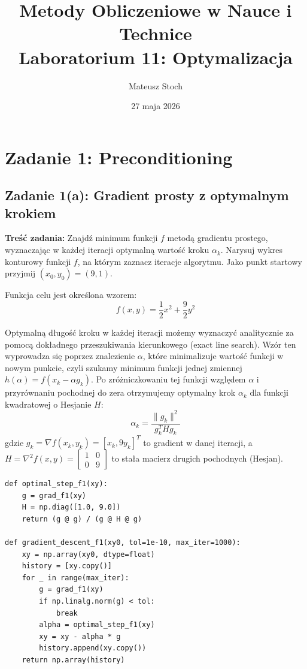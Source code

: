 \documentclass[12pt, a4paper]{article}
\title{
  \textbf{Metody Obliczeniowe w Nauce i Technice} \\[0.5em]
  \large Laboratorium 11: Optymalizacja
}
\author{Mateusz Stoch}
\date{27 maja 2026}
\begin{document}
\maketitle

\section{Zadanie 1: Preconditioning}

\subsection{Zadanie 1(a): Gradient prosty z optymalnym krokiem}

\textbf{Treść zadania:} Znajdź minimum funkcji $f$ metodą gradientu prostego, wyznaczając w każdej iteracji optymalną wartość kroku $\alpha_k$. Narysuj wykres konturowy funkcji $f$, na którym zaznacz iteracje algorytmu. Jako punkt startowy przyjmij $(x_0, y_0) = (9, 1)$.

Funkcja celu jest określona wzorem:
\[
  f(x, y) = \frac{1}{2}x^2 + \frac{9}{2}y^2
\]

Optymalną długość kroku w każdej iteracji możemy wyznaczyć analitycznie za pomocą dokładnego przeszukiwania kierunkowego (exact line search). Wzór ten wyprowadza się poprzez znalezienie $\alpha$, które minimalizuje wartość funkcji w nowym punkcie, czyli szukamy minimum funkcji jednej zmiennej $h(\alpha) = f(x_k - \alpha g_k)$. Po zróżniczkowaniu tej funkcji względem $\alpha$ i przyrównaniu pochodnej do zera otrzymujemy optymalny krok $\alpha_k$ dla funkcji kwadratowej o Hesjanie $H$:
\[
  \alpha_k = \frac{\|g_k\|^2}{g_k^T H g_k}
\]
gdzie $g_k = \nabla f(x_k, y_k) = [x_k, 9y_k]^T$ to gradient w danej iteracji, a $H = \nabla^2 f(x, y) = \begin{bmatrix} 1 & 0 \\ 0 & 9 \end{bmatrix}$ to stała macierz drugich pochodnych (Hesjan).

\begin{lstlisting}[caption={Gradient prosty z optymalnym krokiem}]
def optimal_step_f1(xy):
    g = grad_f1(xy)
    H = np.diag([1.0, 9.0])
    return (g @ g) / (g @ H @ g)

def gradient_descent_f1(xy0, tol=1e-10, max_iter=1000):
    xy = np.array(xy0, dtype=float)
    history = [xy.copy()]
    for _ in range(max_iter):
        g = grad_f1(xy)
        if np.linalg.norm(g) < tol:
            break
        alpha = optimal_step_f1(xy)
        xy = xy - alpha * g
        history.append(xy.copy())
    return np.array(history)
\end{lstlisting}
\end{document}
